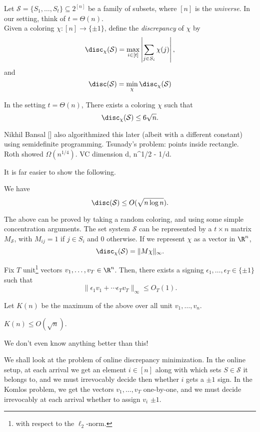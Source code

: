 
Let $\mathcal{S} = \{S_1,\ldots,S_t\} \subseteq 2^{[n]}$ be a family of subsets, where $[n]$ is the \emph{universe}. In our setting, think of $t = \Theta(n)$.\\
Given a coloring $\chi : [n] \to \{\pm 1\}$, define the \emph{discrepancy} of $\chi$ by
\[ \disc_{\chi}(\mathcal{S}) = \max_{i \in [t]} \left| \sum_{j \in S_i} \chi(j) \right|, \]
and
\[ \disc(\mathcal{S}) = \min_{\chi} \disc_{\chi}(\mathcal{S}) \]

\begin{ftheo}[Spencer 1985]
	In the setting $t = \Theta(n)$, There exists a coloring $\chi$ such that
	\[ \disc_{\chi}(\mathcal{S}) \le 6\sqrt{n}. \]
\end{ftheo}
Nikhil Bansal [] also algorithmized this later (albeit with a different constant) using semidefinite programming.
Tsunady's problem: points inside rectangle. Roth showed $\Omega(n^{1/4})$. VC dimension d, n^{1/2 - 1/d}.

It is far easier to show the following.
\begin{fprop}
	We have
	\[ \disc(\mathcal{S}) \le O(\sqrt{n \log n}). \]
\end{fprop}
The above can be proved by taking a random coloring, and using some simple concentration arguments. The set system $\mathcal{S}$ can be represented by a $t \times n$ matrix $M_\mathcal{S}$, with $M_{ij} = 1$ if $j \in S_i$ and $0$ otherwise. If we represent $\chi$ as a vector in $\R^n$,
\[ \disc_{\chi}(\mathcal{S}) = \|M\chi\|_\infty. \]

\begin{fcon}
	Fix $T$ unit\footnote{with respect to the $\ell_2$-norm.} vectors $v_1,\ldots,v_T \in \R^n$. Then, there exists a signing $\epsilon_1,\ldots,\epsilon_T \in \{\pm 1\}$ such that
	\[ \|\epsilon_1 v_1 + \cdots \epsilon_T v_T\|_\infty \le O_T(1). \]
\end{fcon}
Let $K(n)$ be the maximum of the above over all unit $v_1,\ldots,v_n$.

\begin{fprop}
	$K(n) \le O(\sqrt{n})$.
\end{fprop}
We don't even know anything better than this!

We shall look at the problem of online discrepancy minimization. In the online setup, at each arrival we get an element $i \in [n]$ along with which sets $S \in \mathcal{S}$ it belongs to, and we must irrevocably decide then whether $i$ gets a $\pm 1$ sign. In the Komlos problem, we get the vectors $v_1,\ldots,v_T$ one-by-one, and we must decide irrevocably at each arrival whether to assign $v_i$ $\pm 1$.

